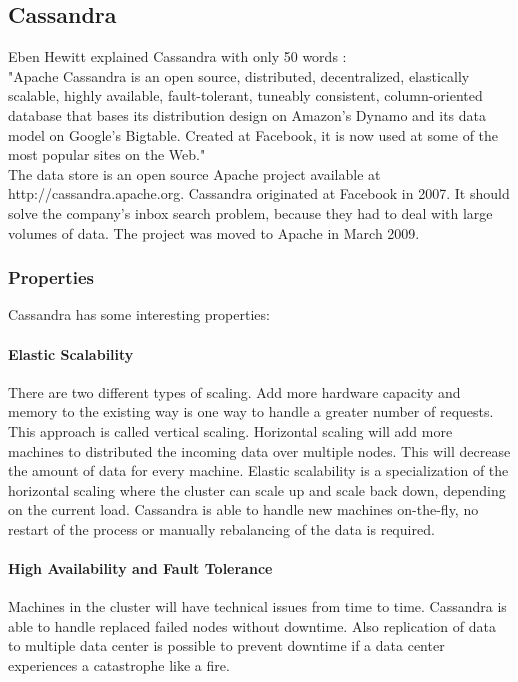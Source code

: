 \documentclass[a4paper]{article}
\begin{document}
\subsection{Cassandra}
Eben Hewitt explained Cassandra with only 50 words \cite{hewitt2010cassandra}:\\

"Apache Cassandra is an open source, distributed, decentralized, elastically scalable, highly  available, fault-tolerant, tuneably consistent, column-oriented database that bases its distribution design on Amazon's Dynamo and its data model on Google's Bigtable\cite{chang2008bigtable}. Created at Facebook, it is now used at some of the most popular sites on the Web."\\

The data store is an open source Apache project available at http://cassandra.apache.org. Cassandra originated at Facebook in 2007. It should solve the company's inbox search problem, because they had to deal with large volumes of data. The project was moved to Apache in March 2009.

\subsubsection{Properties}
Cassandra has some interesting properties:

\paragraph{Elastic Scalability }
There are two different types of scaling. Add more hardware capacity and memory to the existing way is one way to handle a greater number of requests. This approach is called vertical scaling. Horizontal scaling will add more machines to distributed the incoming data over multiple nodes. This will decrease the amount of data for every machine. Elastic scalability is a specialization of the horizontal scaling where the cluster can scale up and scale back down, depending on the current load. Cassandra is able to handle new machines on-the-fly, no restart of the process or manually rebalancing of the data is required. 
\paragraph{High Availability and Fault Tolerance}
Machines in the cluster will have technical issues from time to time. Cassandra is able to handle replaced failed nodes without downtime. Also replication of data to multiple data center is possible to prevent downtime if a data center experiences a catastrophe like a fire. 
\end{document}
